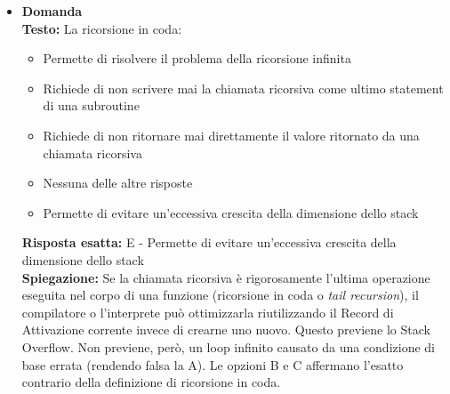 \documentclass[12pt, a4paper]{article}
\newcounter{domandateoria}
\begin{document}
\begin{itemize}
    \item {}\textbf{Domanda \thedomandateoria} \\
    \textbf{Testo:} La ricorsione in coda:
    \begin{itemize}
        \item[A)] Permette di risolvere il problema della ricorsione infinita
        \item[B)] Richiede di non scrivere mai la chiamata ricorsiva come ultimo statement di una subroutine
        \item[C)] Richiede di non ritornare mai direttamente il valore ritornato da una chiamata ricorsiva
        \item[D)] Nessuna delle altre risposte
        \item[E)] Permette di evitare un'eccessiva crescita della dimensione dello stack
    \end{itemize}
    \textbf{Risposta esatta:} E - Permette di evitare un'eccessiva crescita della dimensione dello stack \\
    \textbf{Spiegazione:} Se la chiamata ricorsiva è rigorosamente l'ultima operazione eseguita nel corpo di una funzione (ricorsione in coda o \textit{tail recursion}), il compilatore o l'interprete può ottimizzarla riutilizzando il Record di Attivazione corrente invece di crearne uno nuovo. Questo previene lo Stack Overflow. Non previene, però, un loop infinito causato da una condizione di base errata (rendendo falsa la A). Le opzioni B e C affermano l'esatto contrario della definizione di ricorsione in coda.
    \vspace{0.3cm}


\end{itemize}
\end{document}
